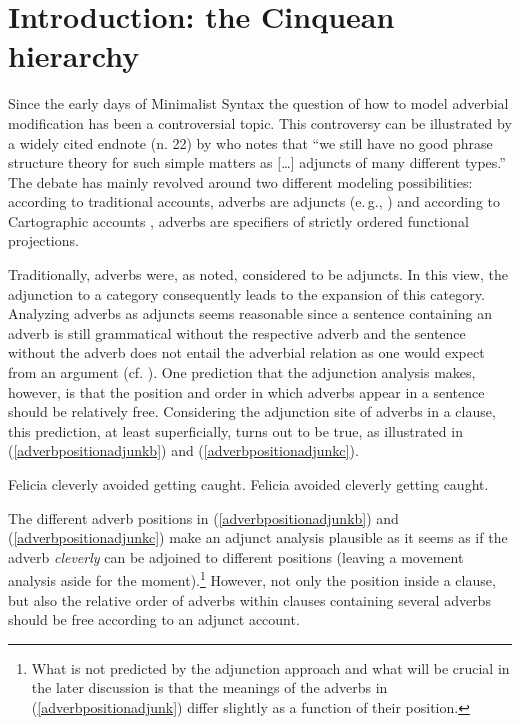 \section{Introduction: the Cinquean hierarchy}\label{introcinque}
Since the early days of Minimalist Syntax the question of how to model adverbial modification has been a controversial topic. This controversy can be illustrated by a widely cited endnote (n. 22) by \citet[382]{chomsky1995categories} who notes that ``we still have no good phrase structure theory for such simple matters as $[$\dots $]$ adjuncts of many different types.'' The debate has mainly revolved around two different modeling possibilities: according to traditional accounts, adverbs are adjuncts (e.\,g., \citealt{travis1988syntax, potsdam1999syntax, ernst2004principles, vanvalin2005exploring}) and according to Cartographic accounts \citep{cinque1999adverbs, cinque2006restructuring}, adverbs are specifiers of strictly ordered functional projections. 

Traditionally, adverbs were, as noted, considered to be adjuncts. In this view, the adjunction to a category consequently leads to the expansion of this category. Analyzing adverbs as adjuncts seems reasonable since a sentence containing an adverb is still grammatical without the respective adverb and the sentence without the adverb does not entail the adverbial relation as one would expect from an argument (cf.  \citealt{hole2015arguments}).  One prediction that the adjunction analysis makes, however, is that the position and order in which adverbs appear in a sentence should be relatively free. Considering the adjunction site of adverbs in a clause, this prediction, at least superficially, turns out to be true, as illustrated in (\ref{adverbpositionadjunkb}) and (\ref{adverbpositionadjunkc}).

\begin{exe} 
\ex \label{adverbpositionadjunk}\begin{xlist} 
\ex Felicia cleverly avoided getting caught. \label{adverbpositionadjunkb} %
\ex Felicia avoided cleverly getting caught.\label{adverbpositionadjunkc} %
\end{xlist} 
\end{exe}

\noindent The different adverb positions in (\ref{adverbpositionadjunkb}) and (\ref{adverbpositionadjunkc}) make an adjunct analysis plausible as it seems as if the adverb \textit{cleverly} can be adjoined to different positions (leaving a movement analysis aside for the moment).\footnote{ What is not predicted by the adjunction approach and what will be crucial in the later discussion is that the meanings of the adverbs in (\ref{adverbpositionadjunk}) differ slightly as a function of their position.} However, not only the position inside a clause, but also the relative order of adverbs within clauses containing several adverbs should be free according to an adjunct account. 

